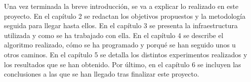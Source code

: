 

\hspace{1 cm} Una vez terminada la breve introducci\'on, se va a explicar lo realizado en este proyecto. En el cap\'itulo 2 se redactan los objetivos propuestos y la metodolog\'ia seguida para llegar hasta ellos. En el cap\'itulo 3 se presenta la infraestructura utilizada y como se ha trabajado con ella. En el cap\'itulo 4 se describe el algoritmo realizado, c\'omo se ha programado y porqu\'e se han seguido unos u otros caminos. En el cap\'itulo 5 se detalla los distintos experimentos realizados y los resultados que se han obtenido. Por \'ultimo, en el cap\'itulo 6 se incluyen las conclusiones a las que se han llegado tras finalizar este proyecto.









